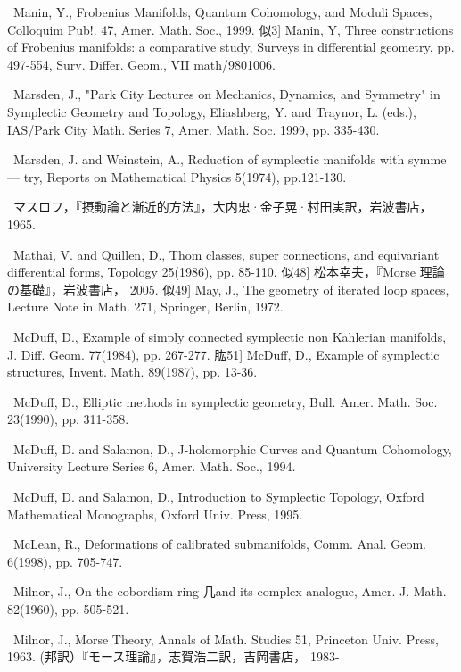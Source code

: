 {\noindent [242]\ Manin, Y., Frobenius Manifolds, Quantum Cohomology, and Moduli Spaces, Colloquim Pub!. 47, Amer. Math. Soc., 1999. 似3] Manin, Y, Three constructions of Frobenius manifolds: a comparative study, Surveys in differential geometry, pp. 497-554, Surv. Differ. Geom., VII math/9801006.\par\smallskip
\noindent [244]\ Marsden, J., "Park City Lectures on Mechanics, Dynamics, and Symmetry" in Symplectic Geometry and Topology, Eliashberg, Y. and Traynor, L. (eds.), IAS/Park City Math. Series 7, Amer. Math. Soc. 1999, pp. 335-430.\par\smallskip
\noindent [245]\ Marsden, J. and Weinstein, A., Reduction of symplectic manifolds with symme— try, Reports on Mathematical Physics 5(1974), pp.121-130.\par\smallskip
\noindent [246]\ マスロフ，『摂動論と漸近的方法』，大内忠·金子晃·村田実訳，岩波書店， 1965.\par\smallskip
\noindent [247]\ Mathai, V. and Quillen, D., Thom classes, super connections, and equivariant differential forms, Topology 25(1986), pp. 85-110. 似48] 松本幸夫，『Morse 理論の基礎』，岩波書店， 2005. 似49] May, J., The geometry of iterated loop spaces, Lecture Note in Math. 271, Springer, Berlin, 1972.\par\smallskip
\noindent [250]\ McDuff, D., Example of simply connected symplectic non Kahlerian manifolds, J. Diff. Geom. 77(1984), pp. 267-277. 肱51] McDuff, D., Example of symplectic structures, Invent. Math. 89(1987), pp. 13-36.\par\smallskip
\noindent [252]\ McDuff, D., Elliptic methods in symplectic geometry, Bull. Amer. Math. Soc. 23(1990), pp. 311-358.\par\smallskip
\noindent [253]\ McDuff, D. and Salamon, D., J-holomorphic Curves and Quantum Cohomology, University Lecture Series 6, Amer. Math. Soc., 1994.\par\smallskip
\noindent [254]\ McDuff, D. and Salamon, D., Introduction to Symplectic Topology, Oxford Mathematical Monographs, Oxford Univ. Press, 1995.\par\smallskip
\noindent [255]\ McLean, R., Deformations of calibrated submanifolds, Comm. Anal. Geom. 6(1998), pp. 705-747.\par\smallskip
\noindent [256]\ Milnor, J., On the cobordism ring 几and its complex analogue, Amer. J. Math. 82(1960), pp. 505-521.\par\smallskip
\noindent [257]\ Milnor, J., Morse Theory, Annals of Math. Studies 51, Princeton Univ. Press, 1963. (邦訳）『モース理論』，志賀浩二訳，吉岡書店， 1983-\par\smallskip
}
